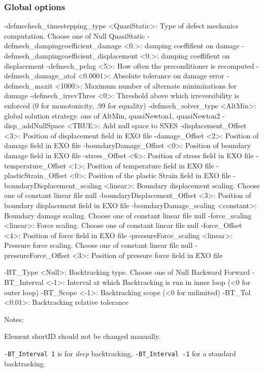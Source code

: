 \documentclass[10pt,oneside]{memoir}
\begin{document}
\subsubsection{Global options}
\small{\begin{boxedverbatim}
-defmechech_timestepping_type <QuasiStatic>: Type of defect mechanics computation. 
                             Choose one of Null QuasiStatic 
-defmech_dampingcoefficient_damage <0.>: damping coeffifient on damage
-defmech_dampingcoefficient_displacement <0.>: damping coeffifient on displacement
-defmech_pclag <5>: How often the preconditioner is recomputed 
-defmech_damage_atol <0.0001>: Absolute tolerance on damage error 
-defmech_maxit <1000>: Maximum number of alternate minimizations for damage 
-defmech_irrevThres <0>: Threshold above which irreversibility is enforced 
                        (0 for monotonicity, .99 for equality) 
-defmech_solver_type <AltMin>: global solution strategy. 
                               one of AltMin, quasiNewton1, quasiNewton2
-disp_addNullSpace <TRUE>: Add null space to SNES 
-displacement_Offset <3>: Position of displacement field in EXO file 
-damage_Offset <2>: Position of damage field in EXO file 
-boundaryDamage_Offset <0>: Position of boundary damage field in EXO file 
-stress_Offset <6>: Position of stress field in EXO file 
-temperature_Offset <1>: Position of temperature field in EXO file 
-plasticStrain_Offset <0>: Position of the plastic Strain field in EXO file 
-boundaryDisplacement_scaling <linear>: Boundary displacement scaling.
                                        Choose one of constant linear file null
-boundaryDisplacement_Offset <3>: Position of boundary displacement field in EXO file 
-boundaryDamage_scaling <constant>: Boundary damage scaling.
                                    Choose one of constant linear file null
-force_scaling <linear>: Force scaling. 
                         Choose one of constant linear file null
-force_Offset <4>: Position of force field in EXO file 
-pressureForce_scaling <linear>: Pressure force scaling. 
                                 Choose one of constant linear file null
-pressureForce_Offset <3>: Position of pressure force field in EXO file 


-BT_Type <Null>: Backtracking type.
                 Choose one of Null Backward Forward
-BT_Interval <-1>: Interval at which Backtracking is run in inner loop 
                   (<0 for outer loop) 
-BT_Scope <-1>: Backtracking scope (<0 for unlimited) 
-BT_Tol <0.01>: Backtracking relative tolerance 
\end{boxedverbatim}}
Notes:
\begin{compactenum}
\item Element shortID should not be changed manually. 
\item \verb+-BT_Interval 1+ is for \emph{deep} backtracking, \verb+-BT_Interval -1+ for a standard backtracking.
\end{compactenum}
\end{document}
